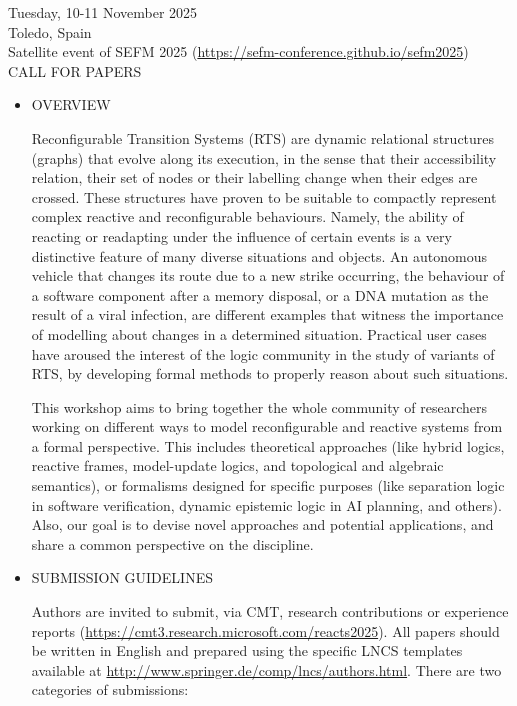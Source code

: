 \documentclass[prodmode,acmtecs]{acmsmall} %
\begin{document}
  Tuesday, 10-11 November 2025\\ 
  Toledo, Spain\\ 
  Satellite event of SEFM 2025 (\href{https://sefm-conference.github.io/sefm2025}{https://sefm-conference.github.io/sefm2025})\\ 
CALL FOR PAPERS 

\begin{itemize}\item  OVERVIEW 
 
  Reconfigurable Transition Systems (RTS) are dynamic relational structures (graphs) that evolve along its execution, in the sense that their accessibility relation, their set of nodes or their labelling change when their edges are crossed. These structures have proven to be suitable to compactly represent complex reactive and reconfigurable behaviours. Namely, the ability of reacting or readapting under the influence of certain events is a very distinctive feature of many diverse situations and objects. An autonomous vehicle that changes its route due to a new strike occurring, the behaviour of a software component after a memory disposal, or a DNA mutation as the result of a viral infection, are different examples that witness the importance of modelling about changes in a determined situation. Practical user cases have aroused the interest of the logic community in the study of variants of RTS, by developing formal methods to properly reason about such situations. 
 
  This workshop aims to bring together the whole community of researchers working on different ways to model reconfigurable and reactive systems from a formal perspective. This includes theoretical approaches (like hybrid logics, reactive frames, model-update logics, and topological and algebraic semantics), or formalisms designed for specific purposes (like separation logic in software verification, dynamic epistemic logic in AI planning, and others). Also, our goal is to devise novel approaches and potential applications, and share a common perspective on the discipline. 
 
\item  SUBMISSION GUIDELINES 
 
  Authors are invited to submit, via CMT, research contributions or experience reports (\href{https://cmt3.research.microsoft.com/reacts2025}{https://cmt3.research.microsoft.com/reacts2025}). All papers should be written in English and prepared using the specific LNCS templates available at \href{http://www.springer.de/comp/lncs/authors.html}{http://www.springer.de/comp/lncs/authors.html}. There are two categories of submissions: 
 

\end{itemize}
\end{document}
